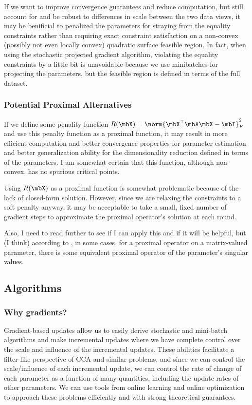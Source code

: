 \documentclass{article}
\begin{document}
	If we want to improve convergence guarantees and reduce computation, but still account for and be robust to differences in scale between the two data views, it may be benificial to penalized the parameters for straying from the equality constraints rather than requiring exact constraint satisfaction on a non-convex (possibly not even locally convex) quadratic surface feasible region. In fact, when using the stochastic projected gradient algorithm, violating the equality constraints by a little bit is unavoidable because we use minibatches for projecting the parameters, but the feasible region is defined in terms of the full dataset.
	
	\subsubsection{Potential Proximal Alternatives} \label{subsubsec:alternatives}
	If we define some penality function $R(\mbX) = \norm{\mbX^{\top}\mbA\mbX - \mbI}_F^2$ and use this penalty function as a proximal function, it may result in more efficient computation and better convergence properties for parameter estimation and better generalization ability for the dimensionality reduction defined in terms of the parameters. I am somewhat certain that this function, although non-convex, has no spurious critical points. 
	
	Using $R(\mbX)$ as a proximal function is somewhat problematic because of the lack of closed-form solution. However, since we are relaxing the constraints to a soft penalty anyway, it may be acceptable to take a small, fixed number of gradient steps to approximate the proximal operator's solution at each round.
	
	Also, I need to read further to see if I can apply this and if it will be helpful, but (I think) according to \cite{parikh2014proximal}, in some cases, for a proximal operator on a matrix-valued parameter, there is some equivalent proximal operator of the parameter's singular values.
	
	\subsection{Algorithms} \label{subsec:alg}
	
	\subsubsection{Why gradients?} \label{subsubsec:whygradients}
	Gradient-based updates allow us to easily derive stochastic and mini-batch algorithms and make incremental updates where we have complete control over the scale and influence of the incremental updates. These abilities facilitate a filter-like perspective of CCA and similar problems, and since we can control the scale/influence of each incremental update, we can control the rate of change of each parameter as a function of many quantities, including the update rates of other parameters. We can use tools from online learning and online optimization to approach these problems efficiently and with strong theoretical guarantees.
\end{document}
